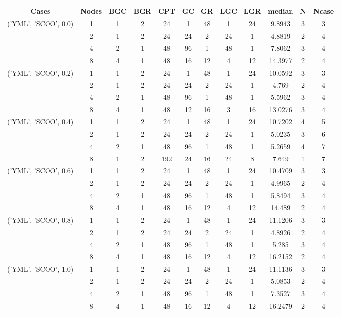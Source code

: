 \begin{tabular}{cccccccccccc}
\hline
Cases & Nodes& BGC& BGR& CPT& GC& GR& LGC& LGR& median & N & Ncase \\
\hline
\multirow{4}{*}{('YML', 'SCOO', 0.0)}& 1& 1& 2& 24& 1& 48& 1& 24& 9.8943& 3& 3\\
& 2& 1& 2& 24& 24& 2& 24& 1& 4.8819& 2& 4\\
& 4& 2& 1& 48& 96& 1& 48& 1& 7.8062& 3& 4\\
& 8& 4& 1& 48& 16& 12& 4& 12& 14.3977& 2& 4\\
\hline
\multirow{4}{*}{('YML', 'SCOO', 0.2)}& 1& 1& 2& 24& 1& 48& 1& 24& 10.0592& 3& 3\\
& 2& 1& 2& 24& 24& 2& 24& 1& 4.769& 2& 4\\
& 4& 2& 1& 48& 96& 1& 48& 1& 5.5962& 3& 4\\
& 8& 4& 1& 48& 12& 16& 3& 16& 13.0276& 3& 4\\
\hline
\multirow{4}{*}{('YML', 'SCOO', 0.4)}& 1& 1& 2& 24& 1& 48& 1& 24& 10.7202& 4& 5\\
& 2& 1& 2& 24& 24& 2& 24& 1& 5.0235& 3& 6\\
& 4& 2& 1& 48& 96& 1& 48& 1& 5.2659& 4& 7\\
& 8& 1& 2& 192& 24& 16& 24& 8& 7.649& 1& 7\\
\hline
\multirow{4}{*}{('YML', 'SCOO', 0.6)}& 1& 1& 2& 24& 1& 48& 1& 24& 10.4709& 3& 3\\
& 2& 1& 2& 24& 24& 2& 24& 1& 4.9965& 2& 4\\
& 4& 2& 1& 48& 96& 1& 48& 1& 5.8494& 3& 4\\
& 8& 4& 1& 48& 16& 12& 4& 12& 14.489& 2& 4\\
\hline
\multirow{4}{*}{('YML', 'SCOO', 0.8)}& 1& 1& 2& 24& 1& 48& 1& 24& 11.1206& 3& 3\\
& 2& 1& 2& 24& 24& 2& 24& 1& 4.8926& 2& 4\\
& 4& 2& 1& 48& 96& 1& 48& 1& 5.285& 3& 4\\
& 8& 4& 1& 48& 16& 12& 4& 12& 16.2152& 2& 4\\
\hline
\multirow{4}{*}{('YML', 'SCOO', 1.0)}& 1& 1& 2& 24& 1& 48& 1& 24& 11.1136& 3& 3\\
& 2& 1& 2& 24& 24& 2& 24& 1& 5.0853& 2& 4\\
& 4& 2& 1& 48& 96& 1& 48& 1& 7.3527& 3& 4\\
& 8& 4& 1& 48& 16& 12& 4& 12& 16.2479& 2& 4\\
\hline
\end{tabular}



